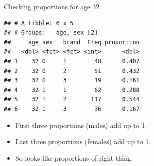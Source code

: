\documentclass[ignorenonframetext,]{beamer}
\newenvironment{Shaded}{\begin{snugshade}}{\end{snugshade}}
\newcommand{\DecValTok}[1]{\textcolor[rgb]{0.00,0.00,0.81}{#1}}
\newcommand{\KeywordTok}[1]{\textcolor[rgb]{0.13,0.29,0.53}{\textbf{#1}}}
\newcommand{\NormalTok}[1]{#1}
\newcommand{\OperatorTok}[1]{\textcolor[rgb]{0.81,0.36,0.00}{\textbf{#1}}}
\newcommand{\StringTok}[1]{\textcolor[rgb]{0.31,0.60,0.02}{#1}}
\begin{document}
\begin{frame}[fragile]{Checking proportions for age 32}
\protect\hypertarget{checking-proportions-for-age-32}{}

\small

\begin{Shaded}
\end{Shaded}

\begin{verbatim}
## # A tibble: 6 x 5
## # Groups:   age, sex [2]
##     age sex   brand  Freq proportion
##   <dbl> <fct> <fct> <int>      <dbl>
## 1    32 0     1        48      0.407
## 2    32 0     2        51      0.432
## 3    32 0     3        19      0.161
## 4    32 1     1        62      0.288
## 5    32 1     2       117      0.544
## 6    32 1     3        36      0.167
\end{verbatim}

\normalsize

\begin{itemize}
\item
  First three proportions (males) add up to 1.
\item
  Last three proportions (females) add up to 1.
\item
  So looks like proportions of right thing.
\end{itemize}

\end{frame}
\end{document}
